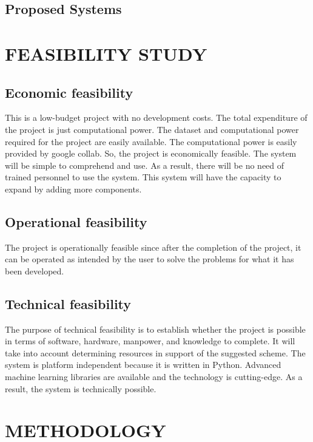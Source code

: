 \documentclass[12 pt]{article}
\begin{document}
\subsection{Proposed Systems}
\newpage


\section{FEASIBILITY STUDY}
\subsection{Economic feasibility}
This is a low-budget project with no development costs. The total expenditure of the
project is just computational power. The dataset and computational power required for
the project are easily available. The computational power is easily provided by google
collab. So, the project is economically feasible. The system will be simple to
comprehend and use. As a result, there will be no need of trained personnel to use the
system. This system will have the capacity to expand by adding more components.

\subsection{Operational feasibility}
The project is operationally feasible since after the completion of the project, it can be
operated as intended by the user to solve the problems for what it has been developed.

\subsection{Technical feasibility}
The purpose of technical feasibility is to establish whether the project is possible in
terms of software, hardware, manpower, and knowledge to complete. It will take into
account determining resources in support of the suggested scheme. The system is
platform independent because it is written in Python. Advanced machine learning
libraries are available and the technology is cutting-edge. As a result, the system is
technically possible.
\newpage

\section{METHODOLOGY}
\end{document}
